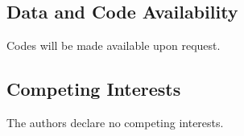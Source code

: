 \subsection{Data and Code Availability}
Codes will be made available upon request.



\subsection{Competing Interests}
The authors declare no competing interests.